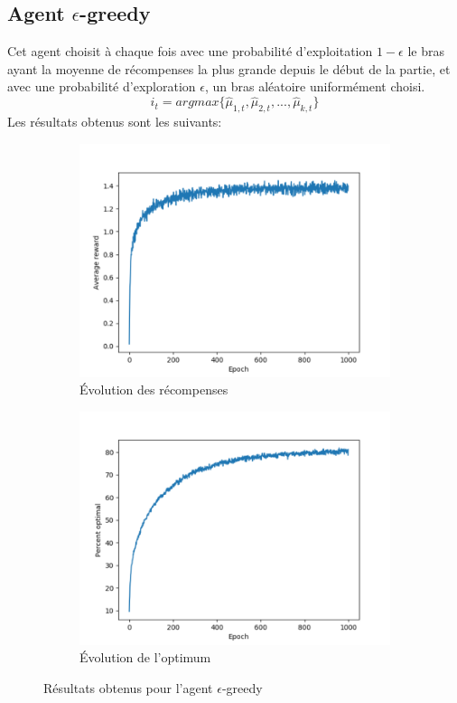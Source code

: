 \documentclass[a4paper,english,12pt]{article}
\begin{document}
\subsection{Agent $\epsilon$-greedy}
Cet agent choisit à chaque fois avec une probabilité d'exploitation $1-\epsilon$ le bras ayant la moyenne de récompenses la plus grande depuis le début de la partie, et avec une probabilité d'exploration $\epsilon$, un bras aléatoire uniformément choisi.
\vspace{-1em}
$$
i_t=argmax\{\hat{\mu}_{1,t},\hat{\mu}_{2,t},...,\hat{\mu}_{k,t}\} 
$$
\vspace{-1em}
Les résultats obtenus sont les suivants:

\begin{figure}[H]
	\centering
	\begin{subfigure}{0.48\textwidth}
		\includegraphics[width=\textwidth]{eps_reward}
		\caption{Évolution des récompenses}
	\end{subfigure}
	\begin{subfigure}{0.48\textwidth}
		\includegraphics[width=\textwidth]{eps_optimal}
		\caption{Évolution de l'optimum}
	\end{subfigure}
	\caption{Résultats obtenus pour l'agent $\epsilon$-greedy}
\end{figure}
\vspace{-1em}
\end{document}
